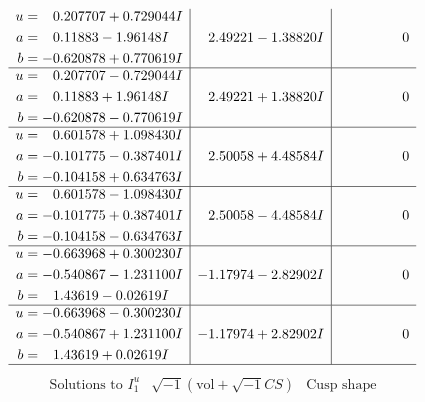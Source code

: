 \documentclass[1p]{elsarticle_modified}
\theoremstyle{definition}
\newcommand{\I}{\sqrt{-1}}
\begin{document}
$$\begin{array}{c|c|c}
\begin{aligned}
u &= \phantom{-}0.207707 + 0.729044 I \\
a &= \phantom{-}0.11883 - 1.96148 I \\
b &= -0.620878 + 0.770619 I\end{aligned}
 & \phantom{-}2.49221 - 1.38820 I & \phantom{-0.000000 } 0 \\ \hline\begin{aligned}
u &= \phantom{-}0.207707 - 0.729044 I \\
a &= \phantom{-}0.11883 + 1.96148 I \\
b &= -0.620878 - 0.770619 I\end{aligned}
 & \phantom{-}2.49221 + 1.38820 I & \phantom{-0.000000 } 0 \\ \hline\begin{aligned}
u &= \phantom{-}0.601578 + 1.098430 I \\
a &= -0.101775 - 0.387401 I \\
b &= -0.104158 + 0.634763 I\end{aligned}
 & \phantom{-}2.50058 + 4.48584 I & \phantom{-0.000000 } 0 \\ \hline\begin{aligned}
u &= \phantom{-}0.601578 - 1.098430 I \\
a &= -0.101775 + 0.387401 I \\
b &= -0.104158 - 0.634763 I\end{aligned}
 & \phantom{-}2.50058 - 4.48584 I & \phantom{-0.000000 } 0 \\ \hline\begin{aligned}
u &= -0.663968 + 0.300230 I \\
a &= -0.540867 - 1.231100 I \\
b &= \phantom{-}1.43619 - 0.02619 I\end{aligned}
 & -1.17974 - 2.82902 I & \phantom{-0.000000 } 0 \\ \hline\begin{aligned}
u &= -0.663968 - 0.300230 I \\
a &= -0.540867 + 1.231100 I \\
b &= \phantom{-}1.43619 + 0.02619 I\end{aligned}
 & -1.17974 + 2.82902 I & \phantom{-0.000000 } 0\\
 \hline 
 \end{array}$$\newpage$$\begin{array}{c|c|c}  
\text{Solutions to }I^u_{1}& \I (\text{vol} + \sqrt{-1}CS) & \text{Cusp shape}\\
 \hline 
\begin{aligned}

\end{aligned}
\end{array}$$
\end{document}
